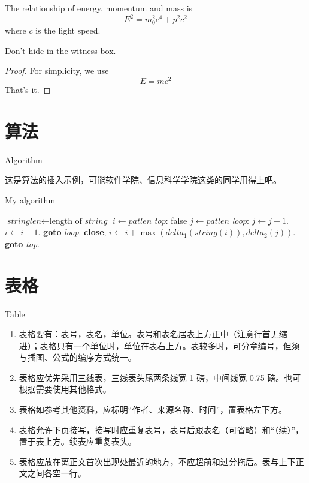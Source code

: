 \begin{theory}
The relationship of energy,
momentum and mass is
\[E^2 = m_0^2 c^4 + p^2 c^2\]
where $c$ is the light speed.
\end{theory}

\begin{law}\label{law:box}
Don't hide in the witness box.
\end{law}


\begin{proof}
For simplicity, we use
\[
E=mc^2
\]
That's it.
\end{proof}


\section{算法}{Algorithm}

这是算法的插入示例，可能软件学院、信息科学学院这类的同学用得上吧。

\begin{algorithm}
	\caption{My algorithm}\label{euclid}
	\begin{algorithmic}[1]
		\State $\textit{stringlen} \gets \text{length of }\textit{string}$
		\State $i \gets \textit{patlen}$
		\BState \emph{top}:
		 \Return false
		\EndIf
		\State $j \gets \textit{patlen}$
		\BState \emph{loop}:
		\State $j \gets j-1$.
		\State $i \gets i-1$.
		\State \textbf{goto} \emph{loop}.
		\State \textbf{close};
		\EndIf
		\State $i \gets i+\max(\textit{delta}_1(\textit{string}(i)),\textit{delta}_2(j))$.
		\State \textbf{goto} \emph{top}.
		\EndProcedure
	\end{algorithmic}
\end{algorithm}


\section{表格}{Table}

\begin{enumerate}
	\item 表格要有：表号，表名，单位。表号和表名居表上方正中（注意行首无缩进）；表格只有一个单位时，单位在表右上方。表较多时，可分章编号，但须与插图、公式的编序方式统一。
	\item 表格应优先采用三线表，三线表头尾两条线宽 1 磅，中间线宽 0.75 磅。也可根据需要使用其他格式。
	\item 表格如参考其他资料，应标明“作者、来源名称、时间”，置表格左下方。
	\item 表格允许下页接写，接写时应重复表号，表号后跟表名（可省略）和“（续）”，置于表上方。续表应重复表头。
	\item 表格应放在离正文首次出现处最近的地方，不应超前和过分拖后。表与上下正文之间各空一行。
\end{enumerate}



